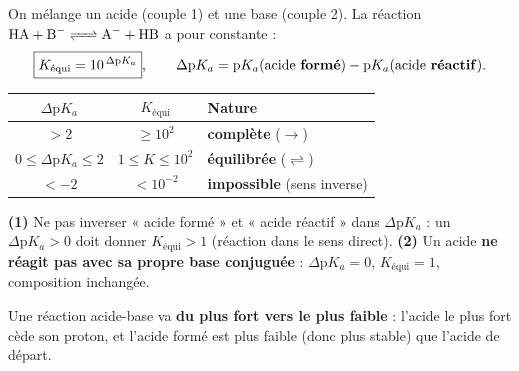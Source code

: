 \documentclass[11pt,a4paper]{article}
\begin{document}
\begin{methode}
On mélange un acide (couple 1) et une base (couple 2). La réaction $\ce{HA + B- <=> A- + HB}$ a pour constante :
\[ \boxed{K_{\text{équi}} = 10^{\,\Delta\mathrm{p}K_a}},\qquad
   \Delta\mathrm{p}K_a = \mathrm{p}K_a(\text{acide \textbf{formé}}) - \mathrm{p}K_a(\text{acide \textbf{réactif}}). \]
\begin{center}\small
\begin{tabular}{ccl}
\toprule
$\Delta\mathrm{p}K_a$ & $K_{\text{équi}}$ & Nature \\
\midrule
$> 2$ & $\geq 10^{2}$ & \textbf{complète} ($\rightarrow$) \\
$0 \leq \Delta\mathrm{p}K_a \leq 2$ & $1 \leq K \leq 10^{2}$ & \textbf{équilibrée} ($\rightleftharpoons$) \\
$< -2$ & $< 10^{-2}$ & \textbf{impossible} (sens inverse) \\
\bottomrule
\end{tabular}
\end{center}
\end{methode}

\begin{piege}
\textbf{(1)} Ne pas inverser « acide formé » et « acide réactif » dans $\Delta\mathrm{p}K_a$ : un $\Delta\mathrm{p}K_a
> 0$ doit donner $K_{\text{équi}} > 1$ (réaction dans le sens direct). \quad
\textbf{(2)} Un acide \textbf{ne réagit pas avec sa propre base conjuguée} : $\Delta\mathrm{p}K_a = 0$,
$K_{\text{équi}} = 1$, composition inchangée.
\end{piege}

\begin{remarque}[la règle d'or]
Une réaction acide-base va \textbf{du plus fort vers le plus faible} : l'acide le plus fort cède son proton, et
l'acide formé est plus faible (donc plus stable) que l'acide de départ.
\end{remarque}
\end{document}
